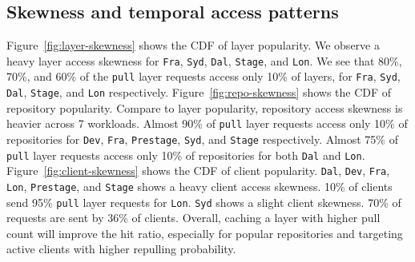 
%

\subsection{Skewness and temporal access patterns}



Figure~\ref{fig:layer-skewness} shows the CDF of layer popularity.
We observe a heavy layer access skewness for \texttt{Fra}, \texttt{Syd}, \texttt{Dal}, \texttt{Stage}, and \texttt{Lon}.
We see that 80\%, 70\%, and 60\% of the \texttt{pull} layer requests access only 10\% of layers, 
for \texttt{Fra}, \texttt{Syd}, \texttt{Dal}, \texttt{Stage}, 
and \texttt{Lon} respectively.
Figure~\ref{fig:repo-skewness} shows the CDF of repository popularity.
Compare to layer popularity, 
repository access skewness is heavier across 7 workloads.
Almost 90\% of \texttt{pull} layer requests access only 10\% of repositories for 
\texttt{Dev}, \texttt{Fra}, \texttt{Prestage}, \texttt{Syd}, and \texttt{Stage} respectively.
Almost 75\% of \texttt{pull} layer requests access only 10\% of repositories for
both \texttt{Dal} and \texttt{Lon}.
Figure~\ref{fig:client-skewness} shows the CDF of client popularity.
\texttt{Dal}, \texttt{Dev}, \texttt{Fra}, \texttt{Lon}, \texttt{Prestage}, and \texttt{Stage} shows a heavy client access skewness.
10\% of clients send 95\% \texttt{pull} layer requests for \texttt{Lon}.
\texttt{Syd} shows a slight client skewness. 70\% of requests are sent by 36\% of clients.
Overall, caching a layer with higher pull count will improve the hit ratio, 
especially for popular repositories and targeting active clients with higher repulling probability. 


